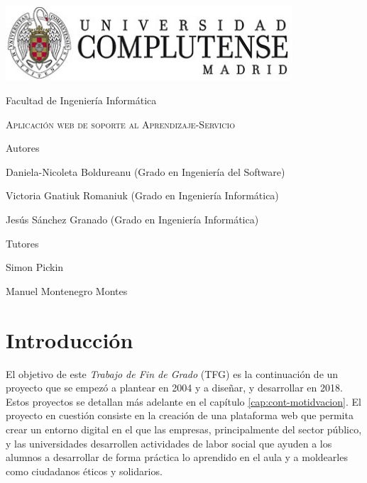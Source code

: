 \documentclass[11pt]{book}
\begin{document}
\begin{titlepage}
	\centering
	{\includegraphics[width=0.8\textwidth]{logo}\par}
	\vspace{1cm}
	{\Large Facultad de Ingeniería Informática \par}
	\vspace{3cm}
	{\scshape\Huge Aplicación web de soporte al Aprendizaje-Servicio \par}
	\vspace{5cm}
	{\textbf\Large Autores \par}
	{\Large Daniela-Nicoleta Boldureanu (Grado en Ingeniería del Software)\par}
	{\Large Victoria Gnatiuk Romaniuk (Grado en Ingeniería Informática)\par}
	{\Large Jesús Sánchez Granado (Grado en Ingeniería Informática)\par}
	\vspace{1cm}
	{\textbf\Large Tutores \par}
	{\Large Simon Pickin \par}
	{\Large Manuel Montenegro Montes \par}
	
\end{titlepage}


\tableofcontents
\newpage
\listoffigures
\chapter{Introducción}
El objetivo de este \textit{Trabajo de Fin de Grado} (TFG) es la continuación de un proyecto que se empezó a plantear en 2004 y a diseñar, y desarrollar en 2018. Estos proyectos se detallan más adelante en el capítulo \ref{cap:cont-motidvacion}. El proyecto en cuestión consiste en la creación de una plataforma web que permita crear un entorno digital en el que las empresas, principalmente del sector público, y las universidades desarrollen actividades de labor social que ayuden a los alumnos a desarrollar de forma práctica lo aprendido en el aula y a moldearles como ciudadanos éticos y solidarios.\\ 
\end{document}
